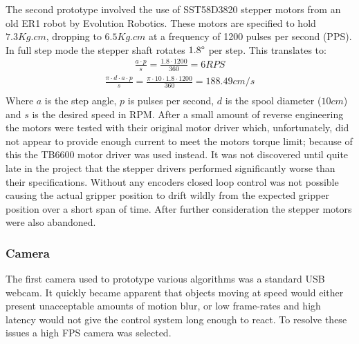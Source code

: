 \documentclass[conference]{IEEEtran}
\begin{document}
The second prototype involved the use of SST58D3820 stepper motors from an old ER1 robot by Evolution Robotics. These motors are specified to hold $7.3Kg.cm$, dropping to $6.5Kg.cm$ at a frequency of 1200 pulses per second (PPS). In full step mode the stepper shaft rotates $1.8\degree$ per step. This translates to: \begin{equation}
\begin{aligned}
\frac{a\cdot p}{s} = \frac{1.8\cdot 1200}{360} = 6 RPS
\end{aligned}
\end{equation}
\begin{equation}
\begin{aligned}
\frac{\pi\cdot d\cdot a\cdot p}{s} = \frac{\pi \cdot 10 \cdot 1.8 \cdot 1200}{360} = 188.49 cm/s\\ 
\end{aligned}
\end{equation} Where $a$ is the step angle, $p$ is pulses per second, $d$ is the spool diameter ($10cm$) and $s$ is the desired speed in RPM. After a small amount of reverse engineering the motors were tested with their original motor driver which, unfortunately, did not appear to provide enough current to meet the motors torque limit; because of this the TB6600 motor driver was used instead. It was not discovered until quite late in the project that the stepper drivers performed significantly worse than their specifications. Without any encoders closed loop control was not possible causing the actual gripper position to drift wildly from the expected gripper position over a short span of time. After further consideration the stepper motors were also abandoned.



\subsubsection{Camera}
The first camera used to prototype various algorithms was a standard USB webcam. It quickly became apparent that objects moving at speed would either present unacceptable amounts of motion blur, or low frame-rates and high latency would not give the control system long enough to react. To resolve these issues a high FPS camera was selected. 
\end{document}
